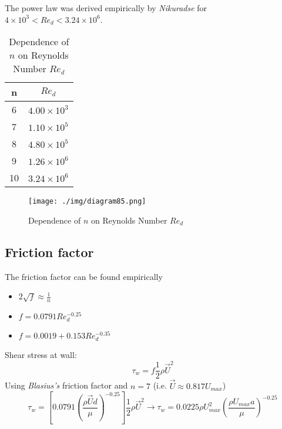 The power law was derived empirically by \textit{Nikuradse} for $4\times10^3 < Re_d < 3.24 \times 10^6$.
\begin{table}[H]
  \begin{center}
    \begin{tabular}{|c|c|}
      \hline
      \textbf{n} & \textbf{$Re_d$}    \\
      \hline
      \hline
      6          & $4.00 \times 10^3$ \\
      \hline
      7          & $1.10 \times 10^5$ \\
      \hline
      8          & $4.80 \times 10^5$ \\
      \hline
      9          & $1.26 \times 10^6$ \\
      \hline
      10         & $3.24 \times 10^6$ \\
      \hline
    \end{tabular}
  \end{center}
  \caption{Dependence of $n$ on Reynolds Number $Re_d$}
\end{table}
\begin{figure}[H]
  \centering
  \texttt{[image: ./img/diagram85.png]}
  \caption{Dependence of $n$ on Reynolds Number $Re_d$}
\end{figure}
\subsection{Friction factor}
The friction factor can be found empirically
\begin{itemize}
  \item {} $2\sqrt{f} \approx \frac{1}{n}$
  \item {} $f = 0.0791 Re_d^{-0.25}$
  \item {} $f=0.0019 + 0.153Re_d^{-0.35}$
\end{itemize}
Shear stress at wall:
\begin{equation}
  \tau_w = f \frac{1}{2} \rho \vec{U}^2
\end{equation}
Using \textit{Blasius's} friction factor and $n=7$ (i.e. $\vec{U} \approx 0.817U_{max}$)
\begin{equation}
  \tau_w = \left[ 0.0791\left(\frac{\rho \vec{U}d}{\mu}\right)^{-0.25} \right] \frac{1}{2}\rho \vec{U}^2 \rightarrow \tau_w = 0.0225 \rho U^2_{max} \left(\frac{\rho U_{max}a}{\mu}\right)^{-0.25}
\end{equation}
